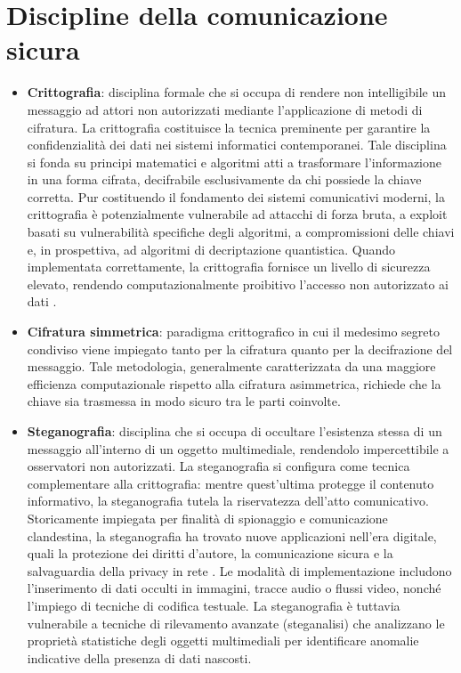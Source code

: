 \section{Discipline della comunicazione sicura}
\begin{itemize}
	\item \textbf{Crittografia}: disciplina formale che si occupa di rendere non intelligibile un messaggio ad attori non autorizzati mediante l'applicazione di metodi di cifratura. La crittografia costituisce la tecnica preminente per garantire la confidenzialità dei dati nei sistemi informatici contemporanei. Tale disciplina si fonda su principi matematici e algoritmi atti a trasformare l'informazione in una forma cifrata, decifrabile esclusivamente da chi possiede la chiave corretta. Pur costituendo il fondamento dei sistemi comunicativi moderni, la crittografia è potenzialmente vulnerabile ad attacchi di forza bruta, a exploit basati su vulnerabilità specifiche degli algoritmi, a compromissioni delle chiavi e, in prospettiva, ad algoritmi di decriptazione quantistica. Quando implementata correttamente, la crittografia fornisce un livello di sicurezza elevato, rendendo computazionalmente proibitivo l'accesso non autorizzato ai dati \cite{neskey-2025}.
	\item \textbf{Cifratura simmetrica}: paradigma crittografico in cui il medesimo segreto condiviso viene impiegato tanto per la cifratura quanto per la decifrazione del messaggio. Tale metodologia, generalmente caratterizzata da una maggiore efficienza computazionale rispetto alla cifratura asimmetrica, richiede che la chiave sia trasmessa in modo sicuro tra le parti coinvolte.
	\item \textbf{Steganografia}: disciplina che si occupa di occultare l'esistenza stessa di un messaggio all'interno di un oggetto multimediale, rendendolo impercettibile a osservatori non autorizzati. La steganografia si configura come tecnica complementare alla crittografia: mentre quest'ultima protegge il contenuto informativo, la steganografia tutela la riservatezza dell'atto comunicativo. Storicamente impiegata per finalità di spionaggio e comunicazione clandestina, la steganografia ha trovato nuove applicazioni nell'era digitale, quali la protezione dei diritti d'autore, la comunicazione sicura e la salvaguardia della privacy in rete \cite{turch-20}. Le modalità di implementazione includono l'inserimento di dati occulti in immagini, tracce audio o flussi video, nonché l'impiego di tecniche di codifica testuale. La steganografia è tuttavia vulnerabile a tecniche di rilevamento avanzate (steganalisi) che analizzano le proprietà statistiche degli oggetti multimediali per identificare anomalie indicative della presenza di dati nascosti.

\end{itemize}
